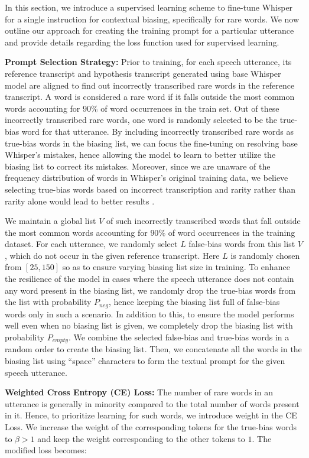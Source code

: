 \documentclass{article}
\begin{document}
In this section, we introduce a supervised learning scheme to fine-tune Whisper for a single instruction for contextual biasing, specifically for rare words.
We now outline our approach for creating the training prompt for a particular utterance and provide details regarding the loss function used for supervised learning.

\textbf{Prompt Selection Strategy:} Prior to training, for each speech utterance, its reference transcript and hypothesis transcript generated using base Whisper model are aligned to find out incorrectly transcribed rare words in the reference transcript. A word is considered a rare word if it falls outside the most common words accounting for $90\%$ of word occurrences in the train set. Out of these incorrectly transcribed rare words, one word is randomly selected to be the true-bias word for that utterance. By including incorrectly transcribed rare words as true-bias words in the biasing list, we can focus the fine-tuning on resolving base Whisper's mistakes, hence allowing the model to learn to better utilize the biasing list to correct its mistakes. Moreover, since we are unaware of the frequency distribution of words in Whisper’s original training data, we believe selecting true-bias words based on incorrect transcription and rarity rather than rarity alone would lead to better results \cite{tcpgen}.

We maintain a global list $V$ of such incorrectly transcribed words that fall outside the most common words accounting for $90\%$ of word occurrences in the training dataset.  For each utterance, we randomly select $L$ false-bias words from this list $V$, which do not occur in the given reference transcript. Here $L$ is randomly chosen from $[25, 150]$ so as to ensure varying biasing list size in training. To enhance the resilience of the model in cases where the speech utterance does not contain any word present in the biasing list, we randomly drop the true-bias words from the list with probability $P_{neg}$, hence keeping the biasing list full of false-bias words only in such a scenario. In addition to this, to ensure the model performs well even when no biasing list is given, we completely drop the biasing list with probability $P_{empty}$. We combine the selected false-bias and true-bias words in a random order to create the biasing list. Then, we concatenate all the words in the biasing list using ``space'' characters to form the textual prompt for the given speech utterance.

\textbf{Weighted Cross Entropy (CE) Loss:} The number of rare words in an utterance is generally in minority compared to the total number of words present in it. Hence, to prioritize learning for such words, we introduce weight in the CE Loss. We increase the weight of the corresponding tokens for the true-bias words to $\beta > 1$ and keep the weight corresponding to the other tokens to $1$. The modified loss becomes:
\end{document}
